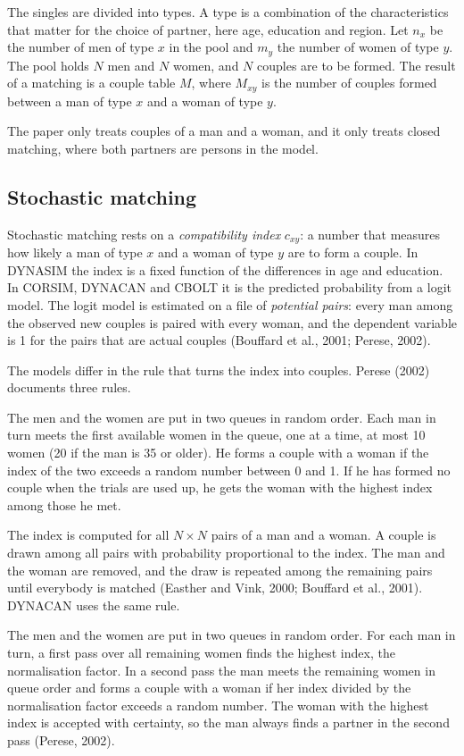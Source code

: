 \documentclass[12pt,a4paper]{article}
\begin{document}
The singles are divided into types. A type is a combination of the characteristics that matter
for the choice of partner, here age, education and region. Let $n_x$ be the number of men of type
$x$ in the pool and $m_y$ the number of women of type $y$. The pool holds $N$ men and $N$ women,
and $N$ couples are to be formed. The result of a matching is a couple table $M$, where $M_{xy}$
is the number of couples formed between a man of type $x$ and a woman of type $y$.

The paper only treats couples of a man and a woman, and it only treats closed matching, where
both partners are persons in the model.

\subsection{Stochastic matching}

Stochastic matching rests on a \emph{compatibility index} $c_{xy}$: a number that measures how
likely a man of type $x$ and a woman of type $y$ are to form a couple. In DYNASIM the index is a
fixed function of the differences in age and education. In CORSIM, DYNACAN and CBOLT it is the
predicted probability from a logit model. The logit model is estimated on a file of
\emph{potential pairs}: every man among the observed new couples is paired with every woman, and
the dependent variable is 1 for the pairs that are actual couples (Bouffard et al., 2001; Perese,
2002).

The models differ in the rule that turns the index into couples. Perese (2002) documents three
rules.

\begin{description}[leftmargin=1.2em, style=nextline, itemsep=4pt]
\item[The DYNASIM rule.] The men and the women are put in two queues in random order. Each man in
turn meets the first available women in the queue, one at a time, at most 10 women (20 if the man
is 35 or older). He forms a couple with a woman if the index of the two exceeds a random number
between 0 and 1. If he has formed no couple when the trials are used up, he gets the woman with
the highest index among those he met.

\item[The CORSIM rule.] The index is computed for all $N \times N$ pairs of a man and a woman. A
couple is drawn among all pairs with probability proportional to the index. The man and the woman
are removed, and the draw is repeated among the remaining pairs until everybody is matched
(Easther and Vink, 2000; Bouffard et al., 2001). DYNACAN uses the same rule.

\item[The CBOLT rule.] The men and the women are put in two queues in random order. For each man
in turn, a first pass over all remaining women finds the highest index, the normalisation
factor. In a second pass the man meets the remaining women in queue order and forms a couple with
a woman if her index divided by the normalisation factor exceeds a random number. The woman with
the highest index is accepted with certainty, so the man always finds a partner in the second
pass (Perese, 2002).
\end{description}
\end{document}
